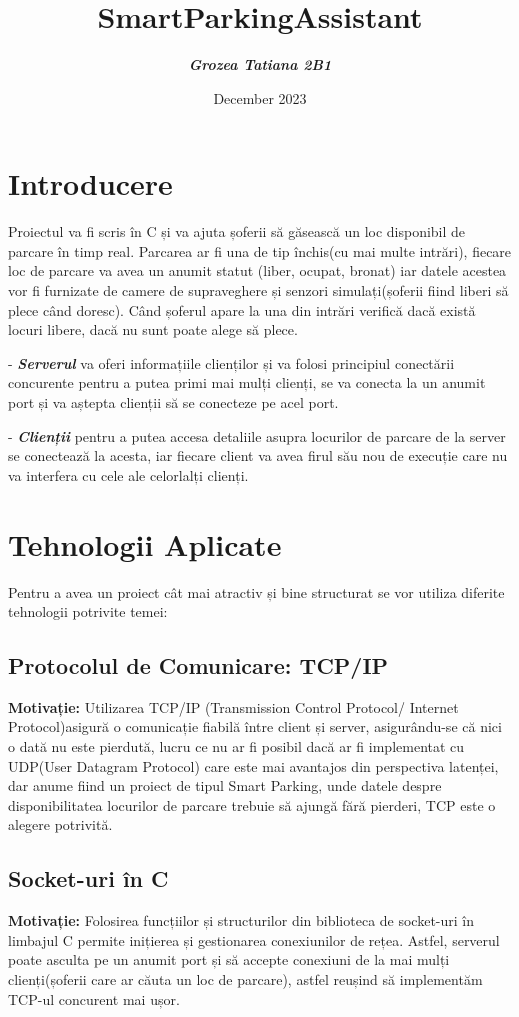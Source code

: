 \documentclass{article}
\title{\textbf{SmartParkingAssistant}}
\author{\textit{\textbf{Grozea Tatiana 2B1}}}
\date{December 2023}
\begin{document}
\maketitle

\section{Introducere}
Proiectul va fi scris în C și va ajuta șoferii să găsească un loc disponibil de parcare în timp real. Parcarea ar fi una de tip închis(cu mai multe intrări), fiecare loc de parcare va avea un anumit statut (liber, ocupat, bronat) iar datele acestea vor fi furnizate de camere de supraveghere și senzori simulați(șoferii fiind liberi să plece când doresc). Când șoferul apare la una din intrări verifică dacă există locuri libere, dacă nu sunt poate alege să plece.

- \textbf{\textit{Serverul}} va oferi informațiile clienților și va folosi principiul conectării concurente pentru a putea primi mai mulți clienți, se va conecta la un anumit port și va aștepta clienții să se conecteze pe acel port.

- \textit{\textbf{Clienții}} pentru a putea accesa detaliile asupra locurilor de parcare de la server se conectează la acesta, iar fiecare client va avea firul său nou de execuție care nu va interfera cu cele ale celorlalți clienți.

\section{Tehnologii Aplicate}
Pentru a avea un proiect cât mai atractiv și bine structurat se vor utiliza diferite tehnologii potrivite temei:

\subsection{Protocolul de Comunicare: TCP/IP}
\textbf{Motivație:} Utilizarea TCP/IP (Transmission Control Protocol/ Internet Protocol)asigură o comunicație fiabilă între client și server, asigurându-se că nici o dată nu este pierdută, lucru ce nu ar fi posibil dacă ar fi implementat cu UDP(User Datagram Protocol) care este mai avantajos din perspectiva latenței, dar anume fiind un proiect de tipul Smart Parking, unde datele despre disponibilitatea locurilor de parcare trebuie să ajungă fără pierderi, TCP este o alegere potrivită.

\subsection{Socket-uri în C}
\textbf{Motivație:} Folosirea funcțiilor și structurilor din biblioteca de socket-uri în limbajul C permite inițierea și gestionarea conexiunilor de rețea. Astfel, serverul poate asculta pe un anumit port și să accepte conexiuni de la mai mulți clienți(șoferii care ar căuta un loc de parcare), astfel reușind să implementăm TCP-ul concurent mai ușor. 
\end{document}
